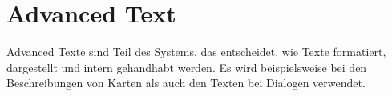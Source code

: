 
\renewcommand{\kapitelautor}{Autor: Felix Zwickelstorfer}
\section{Advanced Text}\label{sec:advanced-text}
\renewcommand{\kapitelautor}{Autor: Felix Zwickelstorfer}

Advanced Texte sind Teil des Systems, das entscheidet, wie Texte formatiert, dargestellt und intern gehandhabt werden.
Es wird beispielsweise bei den Beschreibungen von Karten als auch den Texten bei Dialogen verwendet.


